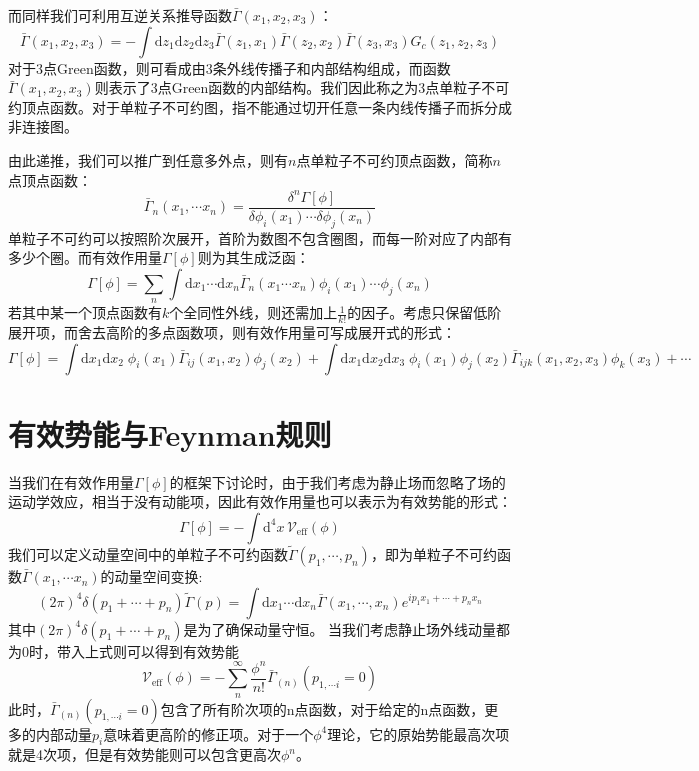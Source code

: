 而同样我们可利用互逆关系推导函数$\bar{\Gamma}(x_1,x_2,x_3)$：
\begin{equation}
\bar{\Gamma}(x_1,x_2,x_3)=-\int\mathrm{d}z_1\mathrm{d}z_2\mathrm{d}z_3 \bar{\Gamma}(z_1,x_1)\bar{\Gamma}(z_2,x_2)\bar{\Gamma}(z_3,x_3)G_c(z_1,z_2,z_3)
\end{equation}
对于3点Green函数，则可看成由3条外线传播子和内部结构组成，而函数$\bar{\Gamma}(x_1,x_2,x_3)$则表示了3点Green函数的内部结构。我们因此称之为3点单粒子不可约顶点函数。对于单粒子不可约图，指不能通过切开任意一条内线传播子而拆分成非连接图。

由此递推，我们可以推广到任意多外点，则有$n$点单粒子不可约顶点函数，简称$n$点顶点函数：
\begin{equation}
\bar{\Gamma}_n(x_1,\cdots x_n)=\frac{\delta^n\Gamma[\phi]}{\delta\phi_i(x_1)\cdots\delta\phi_j(x_n)}
\end{equation}
单粒子不可约可以按照阶次展开，首阶为数图不包含圈图，而每一阶对应了内部有多少个圈。而有效作用量$\Gamma[\phi]$则为其生成泛函：
\begin{equation}
\Gamma[\phi]=\sum_{n}\int\mathrm{d}x_1\cdots\mathrm{d}x_n\bar{\Gamma}_n(x_1\cdots x_n)\phi_i(x_1)\cdots\phi_j(x_n)
\end{equation}
若其中某一个顶点函数有$k$个全同性外线，则还需加上$\frac{1}{k!}$的因子。考虑只保留低阶展开项，而舍去高阶的多点函数项，则有效作用量可写成展开式的形式：
\begin{equation}
\Gamma[\phi]=\int\mathrm{d}x_1\mathrm{d}x_2\;\phi_i(x_1)\bar{\Gamma}_{ij}(x_1,x_2)\phi_j(x_2)+\int\mathrm{d}x_1\mathrm{d}x_2\mathrm{d}x_3\;\phi_i(x_1)\phi_j(x_2)\bar{\Gamma}_{ijk}(x_1,x_2,x_3)\phi_k(x_3)+\cdots
\end{equation}
\section{有效势能与Feynman规则}
当我们在有效作用量$\Gamma[\phi]$的框架下讨论时，由于我们考虑为静止场而忽略了场的运动学效应，相当于没有动能项，因此有效作用量也可以表示为有效势能的形式：
\begin{equation}
    \Gamma[\phi]=-\int\mathrm{d}^4x\,\mathscr{V}_\mathrm{eff}(\phi)\label{eq:veff0}
\end{equation}
我们可以定义动量空间中的单粒子不可约函数$\tilde{\Gamma}(p_1,\cdots,p_n)$，即为单粒子不可约函数$\bar{\Gamma}(x_1,\cdots x_n)$的动量空间变换:
\begin{equation}
(2\pi)^4\delta(p_1+\cdots+p_n)\tilde{\Gamma}(p)=\int\mathrm{d}x_1\cdots\mathrm{d}x_n\bar{\Gamma}(x_1,\cdots,x_n)e^{ip_1x_1+\cdots+p_nx_n}\label{eq:effvert}
\end{equation}
其中$(2\pi)^4\delta(p_1+\cdots+p_n)$是为了确保动量守恒。
当我们考虑静止场外线动量都为0时，带入上式则可以得到有效势能
\begin{equation}
    \mathscr{V}_\mathrm{eff}(\phi) = -\sum_n^\infty \frac{\phi^n}{n!} \bar{\Gamma}_{(n)}(p_{1,\cdots i}=0) \label{eq:effpot}
\end{equation}
此时，$\bar{\Gamma}_{(n)}(p_{1,\cdots i}=0) $包含了所有阶次项的n点函数，对于给定的n点函数，更多的内部动量$p_i$意味着更高阶的修正项。对于一个$\phi^4$理论，它的原始势能最高次项就是4次项，但是有效势能则可以包含更高次$\phi^n$。

